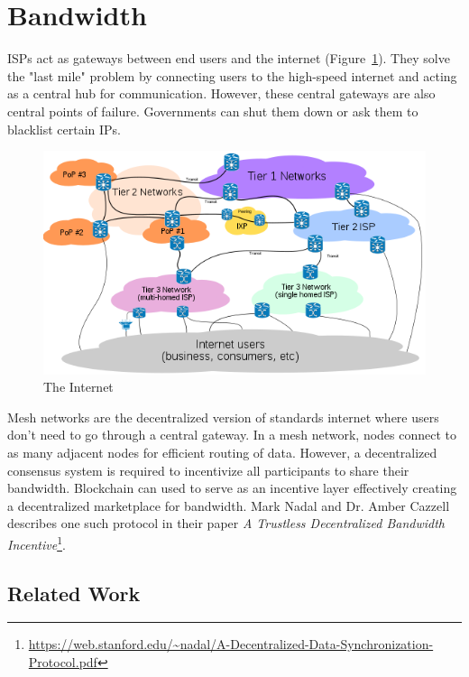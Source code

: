 \section{Bandwidth}
	ISPs act as gateways between end users and the internet (Figure~\ref{fig:internet-backbone}). They solve the "last mile" problem by connecting users to the high-speed internet and acting as a central hub for communication. However, these central gateways are also central points of failure. Governments can shut them down or ask them to blacklist certain IPs\cite{raval2016decentralized}.
	
	\begin{figure}[h]
		\includegraphics[width=\linewidth]{figures/internet-backbone}
		\caption{\label{fig:internet-backbone} The Internet\protect\footnotemark}
	\end{figure}
	
	Mesh networks are the decentralized version of standards internet where users don't need to go through a central gateway. In a mesh network, nodes connect to as many adjacent nodes for efficient routing of data. However, a decentralized consensus system is required to incentivize all participants to share their bandwidth. Blockchain can used to serve as an incentive layer effectively creating a decentralized marketplace for bandwidth. Mark Nadal and Dr. Amber Cazzell describes one such protocol in their paper \textit{A Trustless Decentralized Bandwidth Incentive}\footnote{\url{https://web.stanford.edu/~nadal/A-Decentralized-Data-Synchronization-Protocol.pdf}}.
	
	\subsection{Related Work}

